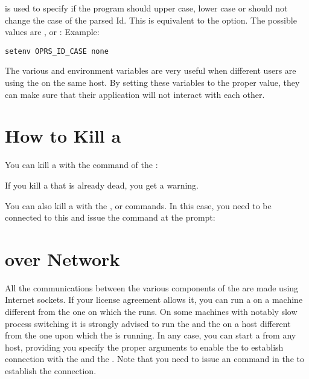 \begin{description}
\item[\code{OPRS\_ID\_CASE}] is used to specify if the program should upper case,
lower case or should not change the case of the parsed Id. This is equivalent
to the  option. The possible values
are ,  or :\*
Example:
\begin{verbatim}
setenv OPRS_ID_CASE none
\end{verbatim}

\end{description}

The various  and  environment variables are very
useful when different users are using the \COPRSDE{} on the same host. By setting
these variables to the proper value, they can make sure that their application
will not interact with each other.

\section{How to Kill a \CPK{}}

You can kill a \CPK{} with the  command of the
\OPRSS{}:


If you kill a \CPK{}that is already dead, you get a warning.

You can also kill a \CPK{} with the ,  or 
commands. In this case, you need to be connected to this \COPRS{} and issue the
command at the prompt:


\section{\CPK{} over Network}

All the communications between the various components of the \COPRSDE{} are made
using Internet sockets. If your license agreement allows it, you can
run a \CPK{} on a machine different from the one on which the \OPRSS{}
runs. On some machines with notably slow process switching it is strongly
advised to run the \OPRSS{} and the \MP{} on a host different from the one
upon which the \CPK{} is running. In any case, you can start a \CPK{} from any
host, providing you specify the proper arguments to enable the \CPK{} to
establish connection with the \OPRSS{} and the \MP{}. Note that you need to
issue an  command in the \OPRSS{} to establish the connection.

